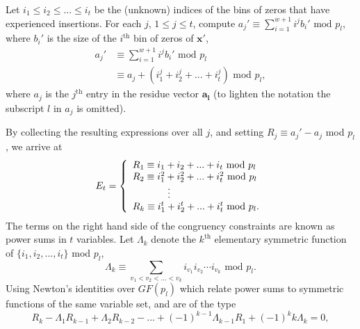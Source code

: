 Let $i_1 \leq i_2 \leq ... \leq i_t$ be the (unknown) indices of
the bins of zeros that have experienced insertions. For each $j$,
$1\leq j \leq t$, compute $a_j'\equiv \sum_{i=1}^{w+1} i^jb_i'
\text{ mod } p_l$, where $b_i'$ is the size of the $i^{\text{th}}$
bin of zeros of $\mathbf{x'}$,
\begin{equation}\begin{array}{ll}
a_j'& \equiv \sum_{i=1}^{w+1} i^jb_i' \text{ mod } p_l\\
{}  & \equiv a_j + (i_1^j+i_2^j+...+i_t^j) \text{ mod }p_l,
\end{array}
\end{equation}
where $a_j$ is the $j^{\text{th}}$ entry in the residue vector
$\mathbf{a_l}$ (to lighten the notation the subscript $l$ in $a_j$
is omitted).

By collecting the resulting expressions over all $j$, and setting
$R_j \equiv a_j'-a_j$ mod $p_l$, we arrive at
\begin{equation}
E_t=\left\{
\begin{array}{ll}
R_1 \equiv i_1+i_2+...+i_t \text{ mod }p_l\\
R_2 \equiv i_1^2+i_2^2+...+i_t^2 \text{ mod }p_l\\
\hspace{0.5in}\vdots\\
R_k \equiv i_1^t+i_2^t+...+i_t^t \text{ mod }p_l.\\
\end{array} \right.
\end{equation}
The terms on the right hand side of the congruency constraints are
known as power sums in $t$ variables. %
Let $\Lambda_k$ denote the $k^{\text{th}}$ elementary symmetric
function of  $\{i_1,i_2,...,i_t\}$ mod $p_l$,
\begin{equation}
\Lambda_k \equiv \sum_{v_1<v_2<...<v_k} i_{v_1}i_{v_2}\cdots
i_{v_k} \text{ mod } p_l.
\end{equation}
Using Newton's identities over $GF(p_l)$ which relate power sums
to symmetric functions of the same variable set, and are of the
type
\begin{equation}\label{newton}
R_k-\Lambda_{1}R_{k-1}+\Lambda_{2}R_{k-2}-...+(-1)^{k-1}\Lambda_{k-1}R_{1}+(-1)^kk\Lambda_{k}
=0,
\end{equation}
